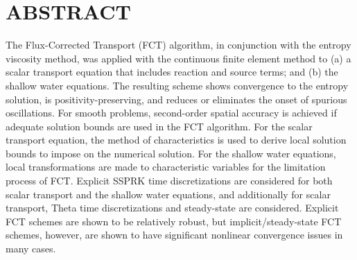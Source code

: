 \chapter*{ABSTRACT}

\pagestyle{plain} %
\setcounter{page}{2}

\indent
The Flux-Corrected Transport (FCT) algorithm, in conjunction with the
entropy viscosity method, was applied with the continuous finite element method
to (a) a scalar transport equation that includes reaction and source terms; and
(b) the shallow water equations.
The resulting scheme shows convergence to the entropy solution, is
positivity-preserving, and reduces or eliminates the onset of spurious oscillations.
For smooth problems, second-order spatial accuracy is achieved if adequate
solution bounds are used in the FCT algorithm. 
For the scalar transport equation, the method of characteristics is used
to derive local solution bounds to impose on the numerical solution.
For the shallow water equations, local transformations are made
to characteristic variables for the limitation process of FCT.
Explicit SSPRK time discretizations are considered for both scalar
transport and the shallow water equations, and additionally
for scalar transport, Theta time discretizations and
steady-state are considered. Explicit FCT schemes are shown to
be relatively robust, but implicit/steady-state FCT schemes, however,
are shown to have significant nonlinear convergence issues in many cases.

\pagebreak{}
